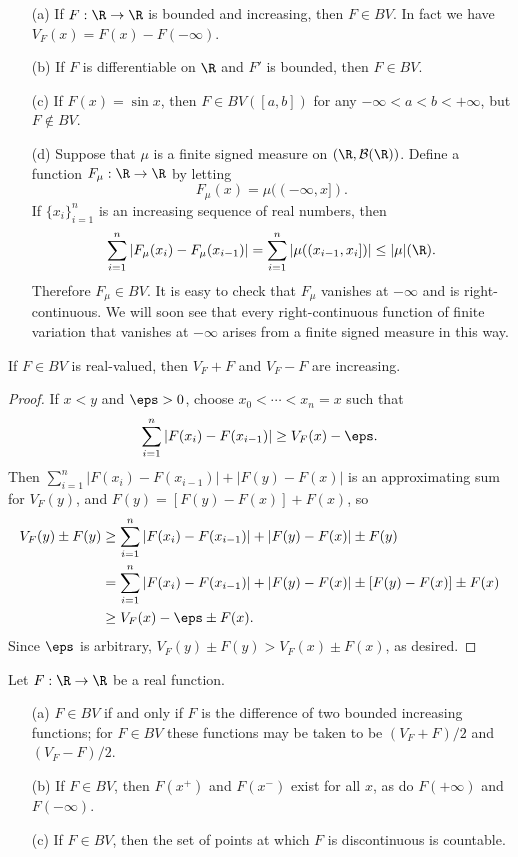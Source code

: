 \begin{example}
\mbox{}
\begin{itemize}
\item[(a)] If $F:\R\to\R$ is bounded and increasing, then $F\in BV$. In fact we have $V_F(x)=F(x)-F(-\infty)$.
\item[(b)] If $F$ is differentiable on $\R$ and $F'$ is bounded, then $F\in BV$.
\item[(c)] If $F(x)=\sin x$, then $F\in BV([a,b])$ for any $-\infty<a<b<+\infty$, but $F\notin BV$. 
\item[(d)] Suppose that $\mu$ is a finite signed measure on $(\R,\mathcal{B}(\R))$. Define a function $F_\mu:\R\to\R$ by letting 
\[F_\mu(x)=\mu((-\infty,x]).\]
If $\{x_i\}_{i=1}^{n}$ is an increasing sequence of real numbers, then
\[\sum_{i=1}^{n}|F_\mu(x_i)-F_\mu(x_{i-1})|=\sum_{i=1}^{n}|\mu((x_{i-1},x_i])|\leq|\mu|(\R).\]
Therefore $F_\mu\in BV$. It is easy to check that $F_\mu$ vanishes at $-\infty$ and is right-continuous. We will soon see that every right-continuous function of finite variation that vanishes at $-\infty$ arises from a finite signed measure in this way.
\end{itemize}
\end{example}
\begin{lemma}\label{bounded variation V_F+F, V_F-F}
If $F\in BV$ is real-valued, then $V_F+F$ and $V_F-F$ are increasing.
\end{lemma}
\begin{proof}
If $x<y$ and $\eps>0$, choose $x_0<\cdots<x_n=x$ such that
\[\sum_{i=1}^{n}|F(x_{i})-F(x_{i-1})|\geq V_F(x)-\eps.\]
Then $\sum_{i=1}^{n}|F(x_{i})-F(x_{i-1})|+|F(y)-F(x)|$ is an approximating sum for $V_F(y)$, and $F(y)=[F(y)-F(x)]+F(x)$, so
\begin{align*}
V_F(y)\pm F(y)&\geq\sum_{i=1}^{n}|F(x_{i})-F(x_{i-1})|+|F(y)-F(x)|\pm F(y)\\
&=\sum_{i=1}^{n}|F(x_{i})-F(x_{i-1})|+|F(y)-F(x)|\pm[F(y)-F(x)]\pm F(x)\\
&\geq V_F(x)-\eps\pm F(x).
\end{align*}
Since $\eps$ is arbitrary, $V_F(y)\pm F(y)>V_F(x)\pm F(x)$, as desired.
\end{proof}
\begin{theorem}\label{bounded variation prop}
Let $F:\R\to\R$ be a real function.
\begin{itemize}
\item[(a)] $F\in BV$ if and only if $F$ is the difference of two bounded increasing functions; for $F\in BV$ these functions may be taken to be $(V_F+F)/2$ and $(V_F-F)/2$.
\item[(b)] If $F\in BV$, then $F(x^+)$ and $F(x^-)$ exist for all $x$, as do $F(+\infty)$ and $F(-\infty)$.
\item[(c)] If $F\in BV$, then the set of points at which $F$ is discontinuous is countable. 
\end{itemize}
\end{theorem}
